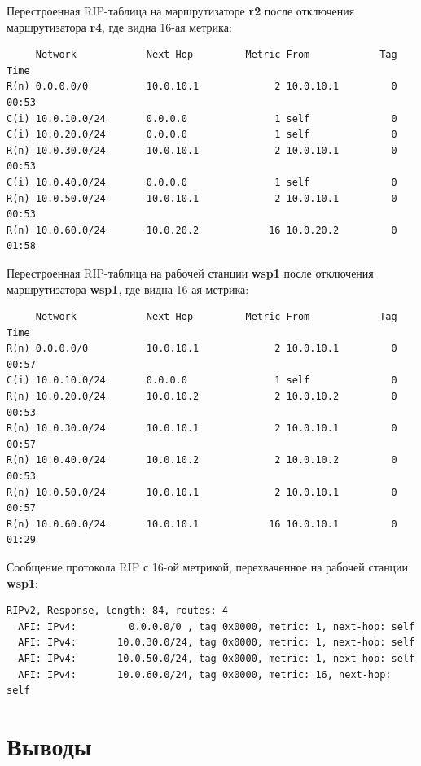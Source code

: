 \documentclass[a4paper,12pt]{article}
\begin{document}
Перестроенная RIP-таблица на маршрутизаторе \textbf{r2} после отключения маршрутизатора \textbf{r4}, где видна 16-ая метрика:

\begin{Verbatim}
     Network            Next Hop         Metric From            Tag Time
R(n) 0.0.0.0/0          10.0.10.1             2 10.0.10.1         0 00:53
C(i) 10.0.10.0/24       0.0.0.0               1 self              0
C(i) 10.0.20.0/24       0.0.0.0               1 self              0
R(n) 10.0.30.0/24       10.0.10.1             2 10.0.10.1         0 00:53
C(i) 10.0.40.0/24       0.0.0.0               1 self              0
R(n) 10.0.50.0/24       10.0.10.1             2 10.0.10.1         0 00:53
R(n) 10.0.60.0/24       10.0.20.2            16 10.0.20.2         0 01:58
\end{Verbatim}

Перестроенная RIP-таблица на рабочей станции \textbf{wsp1} после отключения маршрутизатора \textbf{wsp1}, где видна 16-ая метрика:

\begin{Verbatim}
     Network            Next Hop         Metric From            Tag Time
R(n) 0.0.0.0/0          10.0.10.1             2 10.0.10.1         0 00:57
C(i) 10.0.10.0/24       0.0.0.0               1 self              0
R(n) 10.0.20.0/24       10.0.10.2             2 10.0.10.2         0 00:53
R(n) 10.0.30.0/24       10.0.10.1             2 10.0.10.1         0 00:57
R(n) 10.0.40.0/24       10.0.10.2             2 10.0.10.2         0 00:53
R(n) 10.0.50.0/24       10.0.10.1             2 10.0.10.1         0 00:57
R(n) 10.0.60.0/24       10.0.10.1            16 10.0.10.1         0 01:29
\end{Verbatim}

Сообщение протокола RIP с 16-ой метрикой, перехваченное на рабочей станции \textbf{wsp1}:

\begin{Verbatim}
RIPv2, Response, length: 84, routes: 4
  AFI: IPv4:         0.0.0.0/0 , tag 0x0000, metric: 1, next-hop: self
  AFI: IPv4:       10.0.30.0/24, tag 0x0000, metric: 1, next-hop: self
  AFI: IPv4:       10.0.50.0/24, tag 0x0000, metric: 1, next-hop: self
  AFI: IPv4:       10.0.60.0/24, tag 0x0000, metric: 16, next-hop: self
\end{Verbatim}

\section{Выводы}
\end{document}
